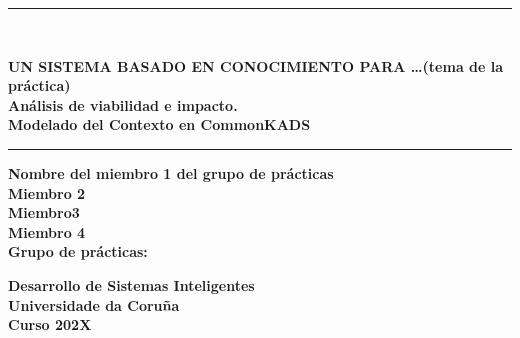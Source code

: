 \documentclass[12pt,a4paper,twoside,spanish]{article}      %
\begin{document}
\def\chaptername{Capítulo}
\def\tablename{Tabla}
\def\listtablename{Índice de Tablas}
\chapterfont{\LARGE\raggedleft}

\pagestyle{empty}

\begin{titlepage}
\setlength{\parindent}{0cm} \setlength{\parskip}{0cm}
\newcommand{\HRule}{\rule{\linewidth}{1mm}}

\vspace*{2cm}
\HRule \\[0.5cm]
\begin{center}
\textsf{\textbf{\large UN SISTEMA BASADO EN CONOCIMIENTO PARA \ldots(tema de la práctica)\\[1.5cm]
Análisis de viabilidad e impacto. \\[0.25cm] Modelado del Contexto en CommonKADS \\[0.5cm]}}
\HRule \vspace*{4cm}

\textsf{\textbf{\normalsize Nombre del miembro 1 del grupo de prácticas\\Miembro 2\\Miembro3\\Miembro 4 \\[1cm]
Grupo de prácticas:\\[3.5cm]}}

\textsf{\textbf{\small Desarrollo de Sistemas Inteligentes\\
Universidade da Coruña \\ Curso 202X}}
\end{center}
\end{titlepage}

\cleardoublepage


\tableofcontents
\cleardoublepage


\end{document}
